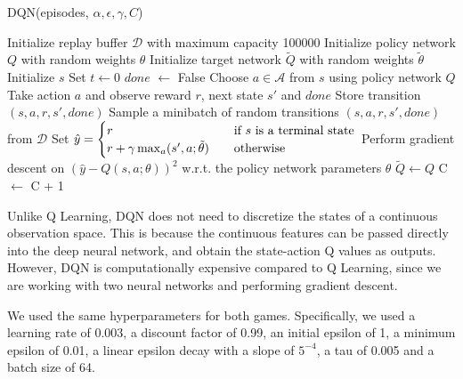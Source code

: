 \documentclass{article}
\begin{document}
\begin{algorithm}[H]
      \caption{DQN(episodes, \(\alpha, \epsilon, \gamma, C\))}
      \label{alg:dqn}
      \begin{algorithmic}[1]
            \State Initialize replay buffer \(\mathcal{D}\) with maximum capacity 100000
            \State Initialize policy network \(Q\) with random weights \(\theta\)
            \State Initialize target network \(\tilde{Q}\) with random weights \(\tilde{\theta}\) 
            \State Initialize \(s\)
            \State Set \(t \leftarrow 0\) 
            \State \(done\) \(\leftarrow\) False
            \State Choose \(a \in \mathcal{A}\) from \(s\) using policy network \(Q\) 
            \State Take action \(a\) and observe reward \(r\), next state \(s'\) and \(done\)
            \State Store transition \((s, a, r, s', done)\)
            \State Sample a minibatch of random transitions \((s, a, r, s', done)\) from \(\mathcal{D}\)
            \State Set \(\hat{y} =
            \begin{cases}
                  r                                                  & \quad \text{if }s \text{ is a terminal state} \\
                  r + \gamma \max_a \title{Q}(s', a; \tilde{\theta}) & \quad \text{otherwise}
            \end{cases}\) 
            \State Perform gradient descent on \(\left(\hat{y} - Q(s, a; \theta)\right)^2\) w.r.t. the policy network parameters \(\theta\)
            \State \(\tilde{Q} \leftarrow Q\) 
            \EndIf
            \State C \(\leftarrow\) C + 1
            \EndWhile
            \EndFor
      \end{algorithmic}
\end{algorithm}

Unlike Q Learning, DQN does not need to discretize the states of a continuous
observation space. This is because the continuous features can be passed
directly into the deep neural network, and obtain the state-action Q values as
outputs. However, DQN is computationally expensive compared to Q Learning,
since we are working with two neural networks and performing gradient descent.

We used the same hyperparameters for both games. Specifically, we used a
learning rate of 0.003, a discount factor of 0.99, an initial epsilon of 1, a
minimum epsilon of 0.01, a linear epsilon decay with a slope of \(5^{-4}\), a
tau of 0.005 and a batch size of 64.
\end{document}
